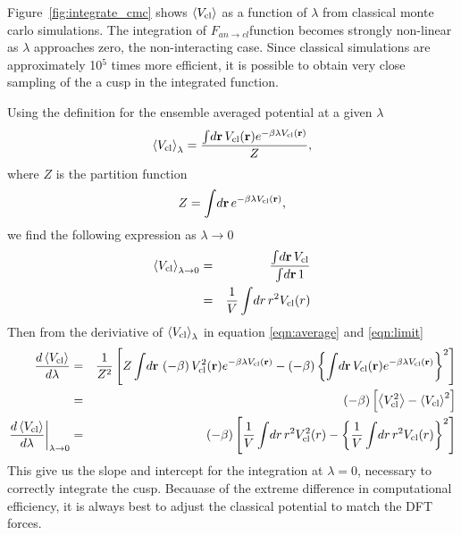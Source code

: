 Figure~\ref{fig:integrate_cmc} shows $\left< V_{\rm cl} \right>$ as a function
of $\lambda$ from classical monte carlo simulations. The integration of
$F_{an \to cl}$function becomes strongly non-linear as $\lambda$
approaches zero, the non-interacting case. Since classical simulations are
approximately 10$^5$ times more efficient, it is possible to obtain very
close sampling of the a cusp in the integrated function. 

Using the definition for the ensemble averaged potential at a given
$\lambda$
\begin{eqnarray}
  \left< V_{\rm cl} \right>_{\lambda} = \frac{ \int \! d{\bf r} \, V_{\rm cl}({\bf r}) 
  e^{ -\beta \lambda V_{\rm cl}({\bf r}) } }
  { Z}, \label{eqn:average}
\end{eqnarray}
where $Z$ is the partition function
\begin{eqnarray}
Z =  \int \! d{\bf r} \, e^{ -\beta \lambda V_{\rm cl}({\bf r}) },
\end{eqnarray}
we find the following expression as $\lambda \to 0$
\begin{eqnarray}
 \left< V_{\rm cl} \right>_{\lambda \to 0} &=& \frac{ \int \! d{\bf r} \, V_{\rm
 cl}}
 {  \int \! d{\bf r} \, 1} \nonumber \\
 &=& \frac{1}{V}  \int \! dr \, r^2 V_{\rm cl}(r) \label{eqn:limit}
\end{eqnarray}
Then from the deriviative of $\left< V_{\rm cl} \right>_{\lambda}$ in
equation \ref{eqn:average} and \ref{eqn:limit}
\begin{eqnarray}
  \frac{d \left< V_{\rm cl} \right>}{d \lambda}
   &=& \frac{1}{Z^2} 
  \left[ Z \int \! d{\bf r} \, \left(-\beta \right)V_{\rm cl}^2({\bf r}) 
    e^{ -\beta \lambda V_{\rm cl}({\bf r}) } 
   - \left(-\beta \right)\left\{  \int \! d{\bf r} \, V_{\rm cl}({\bf r}) e^{ -\beta \lambda
     V_{\rm cl}({\bf r}) } \right\}^2
    \right] \nonumber \\
   &=& (-\beta) \left[ \left< V_{\rm cl}^2 \right> - \left< V_{\rm
   cl}\right>^2 \right] \nonumber \\
   \left. \frac{d \left< V_{\rm cl} \right>}{d \lambda}\right|_{\lambda \to 0} 
   &=& (-\beta) \left[  \frac{1}{V}  \int \! dr \, r^2 V^2_{\rm cl}(r) -
     \left\{ \frac{1}{V}  \int \! dr \, r^2 V_{\rm cl}(r) \right\}^2 \right]
  \end{eqnarray}
This give us the slope and intercept for the integration at $\lambda=0$,
necessary to correctly integrate the cusp.  Becauase of the extreme
difference in computational efficiency, it is always best to adjust the
classical potential to match the DFT forces.

